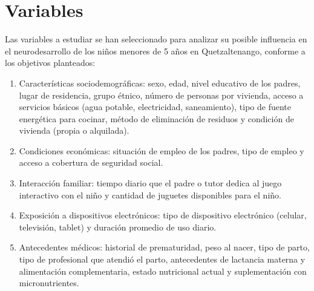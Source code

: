 \documentclass[11pt,letterpaper]{report}
\begin{document}
\section{Variables}
Las variables a estudiar se han seleccionado para analizar su posible
influencia en el neurodesarrollo de los niños menores de 5 años en
Quetzaltenango, conforme a los objetivos planteados:
\begin{enumerate}
	\item Características sociodemográficas: sexo, edad, nivel educativo de los padres,
lugar de residencia, grupo étnico, número de personas por vivienda, acceso a                          servicios básicos (agua potable, electricidad, saneamiento), tipo de fuente
energética para cocinar, método de eliminación de residuos y condición de
vivienda (propia o alquilada).
	\item Condiciones económicas: situación de empleo de los padres, tipo de empleo y
acceso a cobertura de seguridad social.
	\item Interacción familiar: tiempo diario que el padre o tutor dedica al juego
interactivo con el niño y cantidad de juguetes disponibles para el niño.
	\item Exposición a dispositivos electrónicos: tipo de dispositivo electrónico
(celular, televisión, tablet) y duración promedio de uso diario.
	\item Antecedentes médicos: historial de prematuridad, peso al nacer, tipo de parto,
tipo de profesional que atendió el parto, antecedentes de lactancia materna y
alimentación complementaria, estado nutricional actual y suplementación con
micronutrientes.
\end{enumerate}
\end{document}
